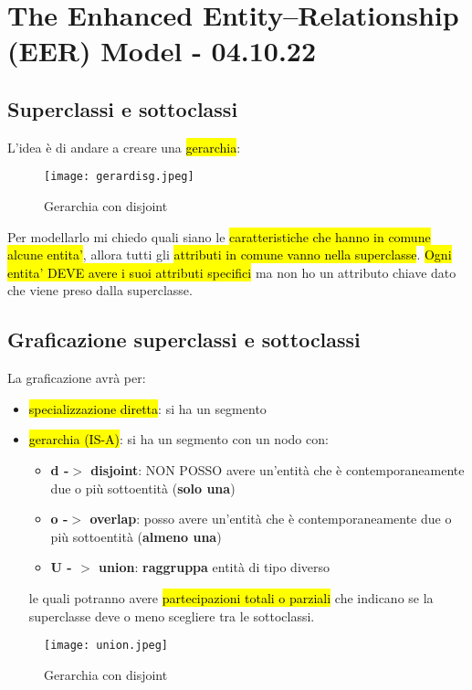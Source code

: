 \newpage
\section{The Enhanced Entity–Relationship (EER) Model - 04.10.22}


\subsection{Superclassi e sottoclassi}

L'idea è di andare a creare una \hl{gerarchia}:


\begin{figure}[H]
\centering
\texttt{[image: gerardisg.jpeg]}
\caption{Gerarchia con disjoint} 
\label{gerardisg}
\end{figure}


Per modellarlo mi chiedo quali siano le \hl{caratteristiche che hanno in comune alcune entita'}, allora tutti gli \hl{attributi in comune vanno nella superclasse}. \hl{Ogni entita' DEVE avere i suoi attributi specifici} ma non ho un attributo chiave dato che viene preso dalla superclasse.


\subsection{Graficazione superclassi e sottoclassi}

La graficazione avrà per:

\begin{itemize}
	\item \hl{specializzazione diretta}: si ha un segmento 
	\item \hl{gerarchia (IS-A)}: si ha un segmento con un nodo con:
		
		\begin{itemize}
			\item \textbf{d -$>$ disjoint}: NON POSSO avere un'entità che è contemporaneamente due o più sottoentità (\textbf{solo una})
			\item \textbf{o -$>$ overlap}: posso avere un'entità che è contemporaneamente due o più sottoentità (\textbf{almeno una})
			\item \textbf{U - $>$ union}: \textbf{raggruppa} entità di tipo diverso
		\end{itemize}
		
		le quali potranno avere \hl{partecipazioni totali o parziali} che indicano se la superclasse deve o meno scegliere tra le sottoclassi.
		
\end{itemize}


\begin{figure}[H]
\centering
\texttt{[image: union.jpeg]}
\caption{Gerarchia con disjoint} 
\label{gerardisg}
\end{figure}